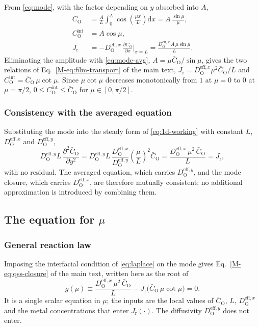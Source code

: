 \documentclass[12pt]{article}
\newcommand{\eff}{\mathrm{eff}}
\newcommand{\intf}{\mathrm{int}}
\newcommand{\Ox}{\mathrm{O}}
\newcommand{\Dx}{D_{\Ox}^{\eff,x}}
\newcommand{\Dy}{D_{\Ox}^{\eff,y}}
\newcommand{\Cb}{\bar{C}_{\Ox}}
\newcommand{\Ci}{C_{\Ox}^{\intf}}
\newcommand{\Jr}{J_{\mathrm{r}}}
\newcommand{\dd}{\mathrm{d}}
\begin{document}
From \eqref{eq:mode}, with the factor depending on \(y\) absorbed into \(A\),
\begin{align}
\Cb&=\frac{A}{L}\int_{0}^{L}\cos\!\left(\frac{\mu x}{L}\right)\dd x
    =A\,\frac{\sin\mu}{\mu},
\label{eq:mode-avg}\\
\Ci&=A\cos\mu,
\label{eq:mode-int}\\
\Jr&=-\Dx\,\frac{\partial C_{\Ox}}{\partial x}\bigg|_{x=L}
    =\frac{\Dx\,A\,\mu\sin\mu}{L}.
\label{eq:mode-flux}
\end{align}
Eliminating the amplitude with \eqref{eq:mode-avg}, \(A=\mu\Cb/\sin\mu\),
gives the two relations of Eq.~\eqref{M-eq:film-transport} of the main text,
\(\Jr=\Dx\mu^{2}\Cb/L\) and \(\Ci=\Cb\,\mu\cot\mu\). Since \(\mu\cot\mu\)
decreases monotonically from \(1\) at \(\mu=0\) to \(0\) at \(\mu=\pi/2\),
\(0\le\Ci\le\Cb\) for \(\mu\in[0,\pi/2]\).

\subsubsection{Consistency with the averaged equation}

Substituting the mode into the steady form of \eqref{eq:1d-working} with
constant \(L\), \(\Dx\) and \(\Dy\),
\begin{equation}
\Dy L\,\frac{\partial^2\Cb}{\partial y^2}
 =\Dy L\,\frac{\Dx}{\Dy}\left(\frac{\mu}{L}\right)^2\Cb
 =\frac{\Dx\,\mu^2\,\Cb}{L}
 =\Jr ,
\end{equation}
with no residual. The averaged equation, which carries \(\Dy\), and the mode
closure, which carries \(\Dx\), are therefore mutually consistent; no
additional approximation is introduced by combining them.

\subsection{The equation for \(\mu\)}
\label{sec:mu}

\subsubsection{General reaction law}

Imposing the interfacial condition of \eqref{eq:laplace} on the mode gives
Eq.~\eqref{M-eq:qss-closure} of the main text, written here as the root of
\begin{equation}
g(\mu)\equiv\frac{\Dx\,\mu^{2}\,\Cb}{L}-\Jr\bigl(\Cb\,\mu\cot\mu\bigr)=0 .
\label{eq:g}
\end{equation}
It is a single scalar equation in \(\mu\); the inputs are the local values of
\(\Cb\), \(L\), \(\Dx\) and the metal concentrations that enter
\(\Jr(\cdot)\). The diffusivity \(\Dy\) does not enter.
\end{document}
